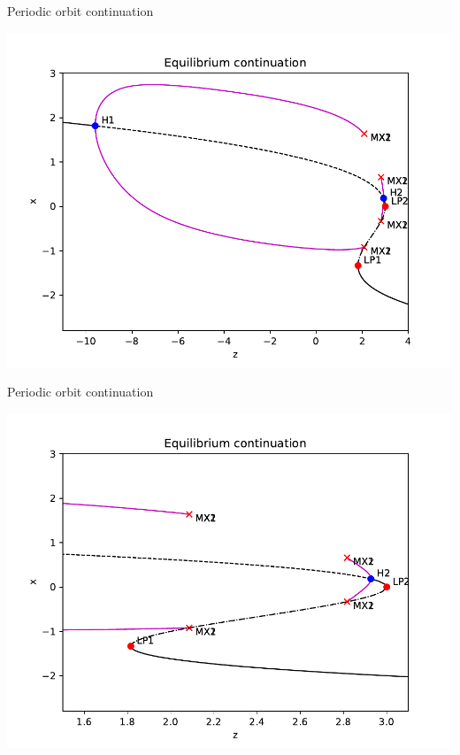 \documentclass[presentation]{beamer}
\begin{document}
\begin{frame}[label={sec:org859235f}]{Periodic orbit continuation}
\begin{center}
\includegraphics[height=.9\textheight]{./epc-2.pdf}
\end{center}
\end{frame}

\begin{frame}[label={sec:orgc0358e0}]{Periodic orbit continuation}
\begin{center}
\includegraphics[height=.9\textheight]{./epc-2-2.pdf}
\end{center}
\end{frame}
\end{document}
